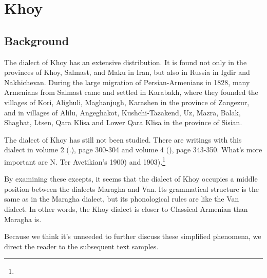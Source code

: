 \chapter{Khoy }\label{chapter:Khoy}

\section{Background}

\begin{adjarianpage}\label{page:288}\end{adjarianpage}%

The dialect of Khoy has an extensive distribution. It is found not only in the provinces of Khoy, Salmast, and Maku in Iran, but also in Russia in Igdir and Nakhichevan. During the large migration of Persian-Armenians in 1828, many Armenians from Salmast came and settled in Karabakh, where they founded the villages of Kori, Alighuli, Maghanjugh, Karashen in the province of Zangezur, and in villages of Alilu, Angeghakot, Kushchi-Tazakend, Uz, Mazra, Balak, Shaghat, Ltsen, Qara Klisa and Lower Qara Klisa in the province of Sisian. 

The dialect of Khoy has still not been studied. There are writings with this dialect in  volume 2 (.), page 300-304 and volume 4 (), page 343-350. What's more important are N. Ter Avetikian's  1900) and  1903).\footnote{}

By examining these excepts, it seems that the dialect of Khoy occupies a middle position between the dialects Maragha and Van. Its grammatical structure is the same as in the Maragha dialect, but its phonological rules are like the Van dialect. In other words, the Khoy dialect is closer to Classical Armenian than Maragha is. 

Because we think it's unneeded to further discuss these simplified phenomena, we direct the reader to the subsequent text samples. 

\begin{adjarianpage}\label{page:289}\end{adjarianpage}%

